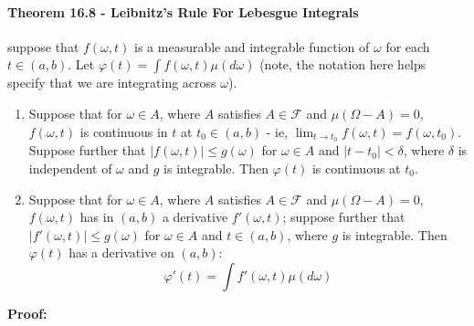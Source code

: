 \documentclass[12pt,a4paper]{article}
\newcommand{\1}[1]{\mathbbm{1}\left\{ #1 \right\}}
\newcommand{\fcal}{\mathcal{F}}
\begin{document}
\paragraph{Theorem 16.8 - Leibnitz's Rule For Lebesgue Integrals} suppose that $f(\omega,t)$ is a measurable and integrable function of $\omega$ for each $t \in (a,b)$. Let $\varphi(t) = \int f(\omega, t) \mu(d\omega)$ (note, the notation here helps specify that we are integrating across $\omega$). 
\begin{enumerate}
	\item Suppose that for $\omega \in A$, where $A$ satisfies $A \in \fcal$ and $\mu(\Omega - A) = 0$, $f(\omega, t)$ is continuous in $t$ at $t_0 \in (a,b)$ - ie, $\lim_{t \to t_0} f(\omega, t) = f(\omega, t_0)$. Suppose further that $|f(\omega, t)| \leq g(\omega)$ for $\omega \in A$ and $|t - t_0| < \delta$, where $\delta$ is independent of $\omega$ and $g$ is integrable. Then $\varphi(t)$ is continuous at $t_0$.
	
	\item Suppose that for $\omega \in A$, where $A$ satisfies $A \in \fcal$ and $\mu(\Omega - A) = 0$, $f(\omega, t)$ has in $(a,b)$ a derivative $f'(\omega,t)$; suppose further that $|f'(\omega, t)| \leq g(\omega)$ for $\omega \in A$ and $t \in (a,b)$, where $g$ is integrable. Then $\varphi(t)$ has a derivative on $(a,b)$:
	$$
		\varphi'(t) = \int f'(\omega, t) \mu(d\omega)
	$$
\end{enumerate}
\textbf{Proof:}
\end{document}
